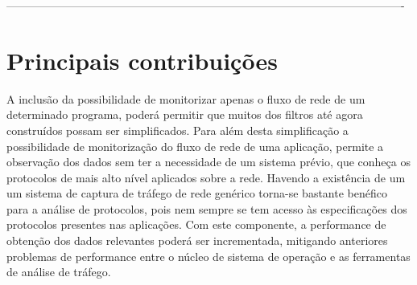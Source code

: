 ----------------------------------------------------------------------------------------------------------

\section{Principais contribuições} 
\label{sec:intro_contribuicoes}

A inclusão da possibilidade de monitorizar apenas o fluxo de rede de um determinado programa, poderá permitir que muitos dos filtros até agora construídos possam ser simplificados.
Para além desta simplificação a possibilidade de monitorização do fluxo de rede de uma aplicação, permite a observação dos dados sem ter a necessidade de um sistema prévio, que conheça os protocolos de mais alto nível aplicados sobre a rede.
Havendo a existência de um um sistema de captura de tráfego de rede genérico torna-se bastante benéfico para a análise de protocolos, pois nem sempre se tem acesso às especificações dos protocolos presentes nas aplicações.
Com este componente, a performance de obtenção dos dados relevantes poderá ser incrementada, mitigando anteriores problemas de performance entre o núcleo de sistema de operação e as ferramentas de análise de tráfego.








